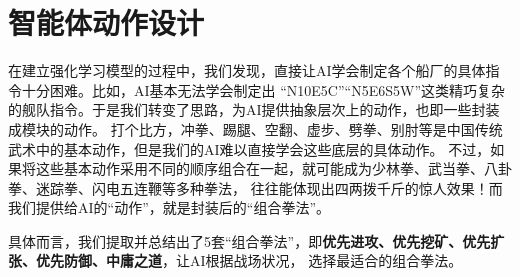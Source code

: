 \documentclass[10pt]{article}
\begin{document}

\section{智能体动作设计}

在建立强化学习模型的过程中，我们发现，直接让AI学会制定各个船厂的具体指令十分困难。比如，AI基本无法学会制定出
“N10E5C”“N5E6S5W”这类精巧复杂的舰队指令。于是我们转变了思路，为AI提供抽象层次上的动作，也即一些封装成模块的动作。
打个比方，冲拳、踢腿、空翻、虚步、劈拳、别肘等是中国传统武术中的基本动作，但是我们的AI难以直接学会这些底层的具体动作。
不过，如果将这些基本动作采用不同的顺序组合在一起，就可能成为少林拳、武当拳、八卦拳、迷踪拳、闪电五连鞭等多种拳法，
往往能体现出四两拨千斤的惊人效果！而我们提供给AI的“动作”，就是封装后的“组合拳法”。

具体而言，我们提取并总结出了5套“组合拳法”，即\textbf{优先进攻、优先挖矿、优先扩张、优先防御、中庸之道}，让AI根据战场状况，
选择最适合的组合拳法。
\end{document}

